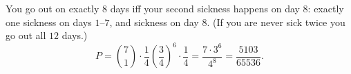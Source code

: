 You go out on exactly $8$ days iff your second sickness happens on day $8$: exactly one sickness on days $1$--$7$, and sickness on day $8$. (If you are never sick twice you go out all $12$ days.)
\[P=\binom71\cdot\dfrac14\left(\dfrac34\right)^6\cdot\dfrac14=\dfrac{7\cdot3^6}{4^8}=\boxed{\dfrac{5103}{65536}}.\]
